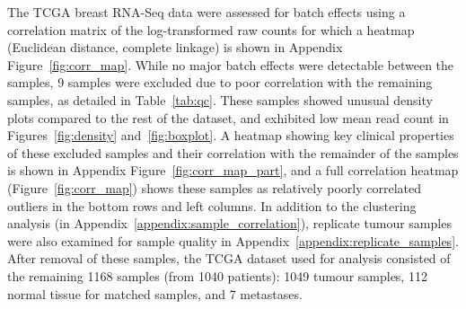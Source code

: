 The \gls{TCGA} breast \gls{RNA-Seq} data were assessed for batch effects using a correlation matrix of the log-transformed raw counts for which a heatmap (Euclidean distance, complete linkage) is shown in Appendix Figure~\ref{fig:corr_map}. While no major batch effects were detectable between the samples, 9 samples were excluded due to poor correlation with the remaining samples, as detailed in Table~\ref{tab:qc}. These samples showed unusual density plots compared to the rest of the dataset, and exhibited low mean read count in Figures~\ref{fig:density} and~\ref{fig:boxplot}. A heatmap showing key clinical properties of these excluded samples and their correlation with the remainder of the samples is shown in Appendix Figure~\ref{fig:corr_map_part}, and a full correlation heatmap (Figure~\ref{fig:corr_map}) shows these samples as relatively poorly correlated outliers in the bottom rows and left columns.
In addition to the clustering analysis (in Appendix~\ref{appendix:sample_correlation}), replicate tumour samples were also examined for sample quality in Appendix~\ref{appendix:replicate_samples}.
After removal of these samples, the \gls{TCGA} dataset used for analysis consisted of the remaining 1168 samples (from 1040 patients): 1049 tumour samples, 112 normal tissue for matched samples, and 7 metastases.


